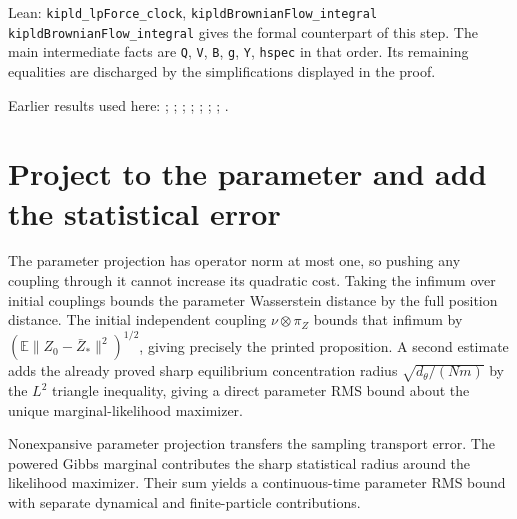 \documentclass[11pt,a4paper]{article}
\begin{document}
\begin{leanbox}{Lean: \texttt{kipld\_\allowbreak{}lpForce\_\allowbreak{}clock}, \texttt{kipldBrownianFlow\_\allowbreak{}integral}}
\texttt{kipld\allowbreak{}Brownian\allowbreak{}Flow\_\allowbreak{}integral} gives the formal counterpart of this step. The main intermediate facts are \texttt{Q}, \texttt{V}, \texttt{B}, \texttt{g}, \texttt{Y}, \texttt{hspec} in that order. Its remaining equalities are discharged by the simplifications displayed in the proof.
\end{leanbox}


Earlier results used here: \cite[Section~3.13.2]{LangevinLean2026ULASC}; \cite[Section~3.13.3]{LangevinLean2026ULASC}; \cite[Section~3.13.5]{LangevinLean2026ULASC}; \cite[Section~3.1.1]{LangevinLean2026IPLA}; \cite[Section~3.1.4]{LangevinLean2026IPLA}; \cite[Section~3.1.1]{LangevinLean2026Kinetic}; \cite[Section~3.19.1]{LangevinLean2026Kinetic}; \cite[Section~3.33.1]{LangevinLean2026Kinetic}.

\section{\texorpdfstring{Project to the parameter and add the statistical error}{Project to the parameter and add the statistical error}}


The parameter projection has operator norm at most one, so pushing any coupling through it cannot increase its quadratic cost. Taking the infimum over initial couplings bounds the parameter Wasserstein distance by the full position distance. The initial independent coupling \(\nu\otimes\pi_Z\) bounds that infimum by \((\mathbb E\|Z_0-\bar Z_*\|^2)^{1/2}\), giving precisely the printed proposition. A second estimate adds the already proved sharp equilibrium concentration radius \(\sqrt{d_\theta/(Nm)}\) by the \(L^{2}\) triangle inequality, giving a direct parameter RMS bound about the unique marginal-likelihood maximizer.



Nonexpansive parameter projection transfers the sampling transport error. The powered Gibbs marginal contributes the sharp statistical radius around the likelihood maximizer. Their sum yields a continuous-time parameter RMS bound with separate dynamical and finite-particle contributions.
\end{document}
